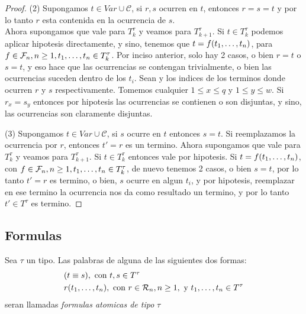 \begin{proof}
  (2) Supongamos $t \in Var \cup \mathcal{C}$, si $r, s$ ocurren en $t$, entonces $r=s=t$ y por lo tanto $r$ esta contenida en la ocurrencia de $s$.\\
  Ahora supongamos que vale para $T^\tau_{k}$ y veamos para $T^\tau_{k+1}$. Si $t\in T^\tau_{k}$ podemos aplicar hipotesis directamente, y sino, tenemos que 
  $t=f(t_{1}, \dots, t_{n})$, para $f\in\mathcal{F}_n,n\geq1,t_{1}, \dots, t_{n}\in T^\tau_k$.
  Por inciso anterior, solo hay 2 casos, o bien $r = t$ o $s = t$, y eso hace que las ocurrencias se contengan trivialmente, o bien las ocurrencias suceden dentro de los $t_i$. Sean 
   y  los indices de los terminos donde ocurren $r$ y $s$ respectivamente. Tomemos cualquier $1\leq x\leq q$ y $1\leq y\leq w$. Si $r_x = s_y$ entonces 
  por hipotesis las ocurrencias se contienen o son disjuntas, y sino, las ocurrencias son claramente disjuntas.

  (3) Supongamos $t\in Var \cup \mathcal{C}$, si $s$ ocurre en $t$ entonces $s = t$. Si reemplazamos la ocurrencia por $r$, entonces $t' = r$ es un termino.
  Ahora supongamos que vale para $T^\tau_k$ y veamos para $T^\tau_{k+1}$. Si $t\in T^\tau_k$ entonces vale por hipotesis. Si $t=f(t_{1}, \dots, t_{n})$, 
  con $f\in\mathcal{F}_n, n\geq1, t_{1}, \dots, t_{n}\in T^\tau_k$, de nuevo tenemos 2 casos, o bien $s = t$, por lo tanto $t'=r$ es termino,
  o bien, $s$ ocurre en algun $t_i$, y por hipotesis, reemplazar en ese termino la ocurrencia nos da como resultado un termino,
  y por lo tanto $t'\in T^\tau$ es termino.

\end{proof}

\subsection{Formulas}

\begin{definition}
  Sea $\tau$ un tipo. Las palabras de alguna de las siguientes dos formas:
  \begin{alignat*}{3}
    &(t \equiv s), \text{ con } t, s \in T^\tau\\
    &r(t_{1}, \dots, t_{n}), \text{ con } r \in \mathcal{R}_n, n \geq 1, \text{ y } t_{1}, \dots, t_{n} \in T^\tau
  \end{alignat*}
  seran llamadas \emph{formulas atomicas de tipo} $\tau$
\end{definition}

